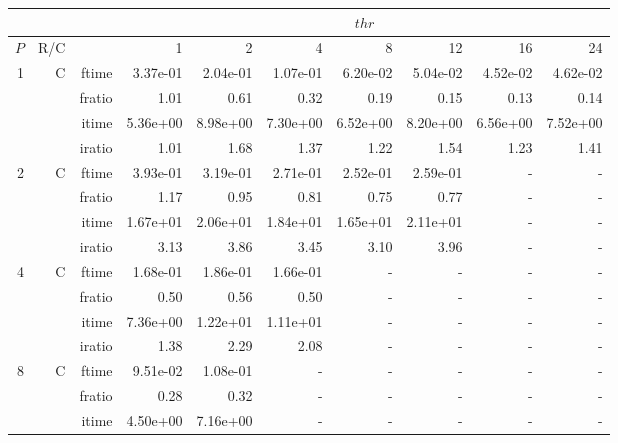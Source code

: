 \documentclass[a4paper]{article}
\begin{document}
\begin{table}[htbp]
\begin{center}
\begin{small}
\begin{tabular}{|r|r|r|r|r|r|r|r|r|r|}
\hline 
     & & & \multicolumn{7}{c|}{$thr$} \\ \hline
    $P$ & R/C &  & 1           & 2    & 4    & 8    & 12   & 16    & 24  \\ \hline\hline
     1 & C & ftime & 3.37e-01 & 2.04e-01 & 1.07e-01 & 6.20e-02 & 5.04e-02 & 4.52e-02 & 4.62e-02 \\   
          &      & fratio & 1.01 & 0.61 & 0.32 & 0.19 & 0.15 & 0.13 & 0.14 \\   
          &      & itime & 5.36e+00 & 8.98e+00 & 7.30e+00 & 6.52e+00 & 8.20e+00 & 6.56e+00 & 7.52e+00 \\   
          &      & iratio & 1.01 & 1.68 & 1.37 & 1.22 & 1.54 & 1.23 & 1.41 \\ \hline 
     2 & C & ftime & 3.93e-01 & 3.19e-01 & 2.71e-01 & 2.52e-01 & 2.59e-01 &     -     &     -     \\   
          &      & fratio & 1.17 & 0.95 & 0.81 & 0.75 & 0.77 &     -     &     -     \\   
          &      & itime & 1.67e+01 & 2.06e+01 & 1.84e+01 & 1.65e+01 & 2.11e+01 &     -     &     -     \\   
          &      & iratio & 3.13 & 3.86 & 3.45 & 3.10 & 3.96 &     -     &     -     \\ \hline 
     4 & C & ftime & 1.68e-01 & 1.86e-01 & 1.66e-01 &     -     &     -     &     -     &     -     \\   
          &      & fratio & 0.50 & 0.56 & 0.50 &     -     &     -     &     -     &     -     \\   
          &      & itime & 7.36e+00 & 1.22e+01 & 1.11e+01 &     -     &     -     &     -     &     -     \\   
          &      & iratio & 1.38 & 2.29 & 2.08 &     -     &     -     &     -     &     -     \\ \hline 
     8 & C & ftime & 9.51e-02 & 1.08e-01 &     -     &     -     &     -     &     -     &     -     \\   
          &      & fratio & 0.28 & 0.32 &     -     &     -     &     -     &     -     &     -     \\   
          &      & itime & 4.50e+00 & 7.16e+00 &     -     &     -     &     -     &     -     &     -     \\   

\end{tabular}
\end{small}
\end{center}
\end{table}
\end{document}
